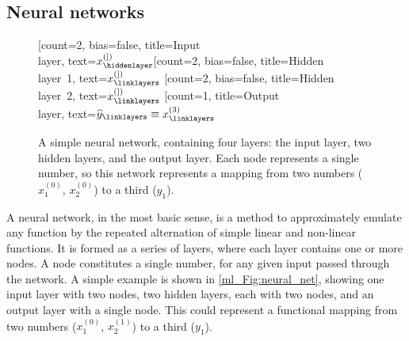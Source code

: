 \subsection{Neural networks}
\label{ml_Sec:neural_nets}

\begin{figure}[tp]
\centering
\begin{neuralnetwork}[nodespacing=20mm, layerspacing=30mm, nodesize=30pt, height=2, layertitleheight=3em]
\newcommand{\nodetextx}[2]{$x^{(#1)}_#2$}
\newcommand{\nodetexty}[2]{$\widehat{y}_#2 \equiv x^{(3)}_#2$}
[count=2, bias=false, title=Input\\layer, text=\nodetextx]
\hiddenlayer[count=2, bias=false, title=Hidden\\layer~1, text=\nodetextx] \linklayers
\hiddenlayer[count=2, bias=false, title=Hidden\\layer~2, text=\nodetextx] \linklayers
\outputlayer[count=1, title=Output\\layer, text=\nodetexty] \linklayers
\end{neuralnetwork}
\caption{A simple neural network, containing four layers: the input layer, two hidden layers, and the output layer.
Each node represents a single number, so this network represents a mapping from two numbers ($x^{(0)}_1$, $x^{(0)}_2$) to a third ($y_1$).
}
\label{ml_Fig:neural_net}
\end{figure}

A neural network, in the most basic sense, is a method to approximately emulate any function by the repeated alternation of simple linear and non-linear functions. It is formed as a series of layers, where each layer contains one or more nodes. A node constitutes a single number, for any given input passed through the network. A simple example is shown in \autoref{ml_Fig:neural_net}, showing one input layer with two nodes, two hidden layers, each with two nodes, and an output layer with a single node. This could represent a functional mapping from two numbers ($x^{(0)}_1$, $x^{(1)}_2$) to a third ($y_1$).

